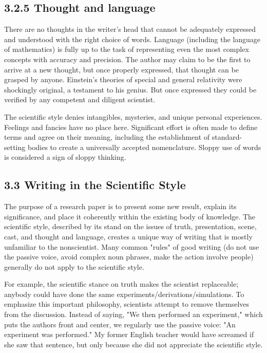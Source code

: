 \subsection*{3.2.5 Thought and language}
There are no thoughts in the writer's head that cannot be adequately expressed and understood with the right choice of words. Language (including the language of mathematics) is fully up to the task of representing even the most complex concepts with accuracy and precision. The author may claim to be the first to arrive at a new thought, but once properly expressed, that thought can be grasped by anyone. Einstein's theories of special and general relativity were shockingly original, a testament to his genius. But once expressed they could be verified by any competent and diligent scientist.

The scientific style denies intangibles, mysteries, and unique personal experiences. Feelings and fancies have no place here. Significant effort is often made to define terms and agree on their meaning, including the establishment of standard-setting bodies to create a universally accepted nomenclature. Sloppy use of words is considered a sign of sloppy thinking.

\subsection*{3.3 Writing in the Scientific Style}
The purpose of a research paper is to present some new result, explain its significance, and place it coherently within the existing body of knowledge. The scientific style, described by its stand on the issues of truth, presentation, scene, cast, and thought and language, creates a unique way of writing that is mostly unfamiliar to the nonscientist. Many common "rules" of good writing (do not use the passive voice, avoid complex noun phrases, make the action involve people) generally do not apply to the scientific style.

For example, the scientific stance on truth makes the scientist replaceable; anybody could have done the same experiments/derivations/simulations. To emphasize this important philosophy, scientists attempt to remove themselves from the discussion. Instead of saying, "We then performed an experiment," which puts the authors front and center, we regularly use the passive voice: "An experiment was performed." My former English teacher would have screamed if she saw that sentence, but only because she did not appreciate the scientific style.

